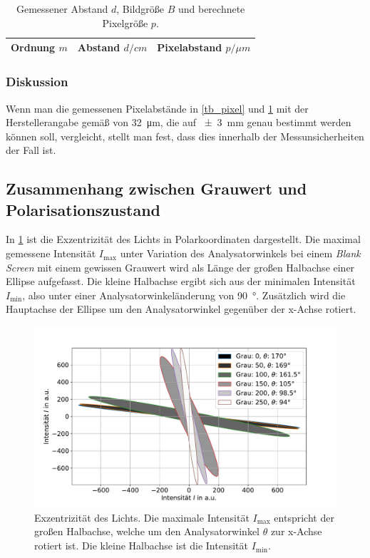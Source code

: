 \documentclass[
	a4paper,
	12pt,
	pagesize,
	ngerman
]{scrartcl}
\begin{document}
\begin{table}[H]
		\centering
		\begin{tabular}{ c | c | c }
			 Ordnung $m$ & Abstand $d/\si{cm}$ & Pixelabstand $p/\si{\mu m}$ \\ \hline
			 
		\end{tabular}
		\caption{
		Gemessener Abstand $d$, Bildgröße $B$ und berechnete Pixelgröße $p$.
		}
		\label{tb_gitter}
\end{table}
			\subsubsection*{Diskussion}
			Wenn man die gemessenen Pixelabstände in \cref{tb_pixel} und \cref{tb_gitter} mit der Herstellerangabe gemäß \cite{Handbuch} von \SI{32}{\micro \meter}, die auf \SI{\pm 3}{mm} genau bestimmt werden können soll, vergleicht, stellt man fest, dass dies innerhalb der Messunsicherheiten der Fall ist. %


		\subsection{Zusammenhang zwischen Grauwert und Polarisationszustand}
		In \cref{fig_ellipse} ist die Exzentrizität des Lichts in Polarkoordinaten dargestellt.
		Die maximal gemessene Intensität $I_\text{max}$ unter Variation des Analysatorwinkels bei einem \textit{Blank Screen} mit einem gewissen Grauwert wird als Länge der großen Halbachse einer Ellipse aufgefasst.
		Die kleine Halbachse ergibt sich aus der minimalen Intensität $I_\text{min}$, also unter einer Analysatorwinkeländerung von \SI{90}{\degree}.
		Zusätzlich wird die Hauptachse der Ellipse um den Analysatorwinkel gegenüber der x-Achse rotiert.


\begin{figure}[H]
			\includegraphics[width=1\linewidth]{img/ellipse}
			\caption{
			Exzentrizität des Lichts. Die maximale Intensität $I_\text{max}$ entspricht der großen Halbachse, welche um den Analysatorwinkel $\theta$ zur x-Achse rotiert ist. Die kleine Halbachse ist die Intensität $I_\text{min}$.
			\protect\footnotemark
			}
			\label{fig_ellipse}
	\end{figure}
\end{document}
